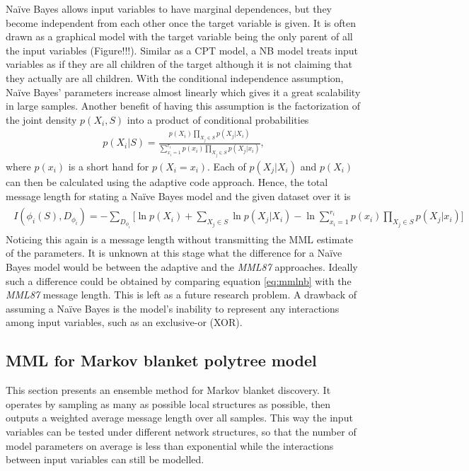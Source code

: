 Na\"ive Bayes allows input variables to have marginal dependences, but they become independent from each other once the target variable is given. It is often drawn as a graphical model with the target variable being the only parent of all the input variables (Figure!!!). Similar as a CPT model, a NB model treats input variables as if they are all children of the target although it is not claiming that they actually are all children. With the conditional independence assumption, Na\"ive Bayes' parameters increase almost linearly which gives it a great scalability in large samples. Another benefit of having this assumption is the factorization of the joint density $p(X_i, S)$ into a product of conditional probabilities
\begin{align}
p(X_i|S) = \frac{p(X_i)\prod_{X_j \in S} p(X_j|X_i)}{\sum_{x_i=1}^{r_i} p(x_i)\prod_{X_j \in S} p(X_j|x_i)},
\end{align}
where $p(x_i)$ is a short hand for $p(X_i = x_i)$. Each of $p(X_j | X_i)$ and $p(X_i)$ can then be calculated using the adaptive code approach. Hence, the total message length for stating a Na\"ive Bayes model and the given dataset over it is 
\begin{align}
\label{eq:mmlnb}
\begin{split}
I(\phi_i(S), D_{\phi_i}) = -\sum_{D_{\phi_i}} \biggl[
\ln p(X_i) + \sum_{X_j \in S} \ln p(X_j|X_i) 
-\ln \sum_{x_i=1}^{r_i} p(x_i)\prod_{X_j \in S} p(X_j|x_i)
\biggr]	
\end{split}
\end{align}
Noticing this again is a message length without transmitting the MML estimate of the parameters. It is unknown at this stage what the difference for a Na\"ive Bayes model would be between the adaptive and the \textit{MML87} approaches. Ideally such a difference could be obtained by comparing equation \ref{eq:mmlnb} with the \textit{MML87} message length. This is left as a future research problem. A drawback of assuming a Na\"ive Bayes is the model's inability to represent any interactions among input variables, such as an exclusive-or (XOR). 


\subsection{MML for Markov blanket polytree model}
This section presents an ensemble method for Markov blanket discovery. It operates by sampling as many as possible local structures as possible, then outputs a weighted average message length over all samples. This way the input variables can be tested under different network structures, so that the number of model parameters on average is less than exponential while the interactions between input variables can still be modelled. 

